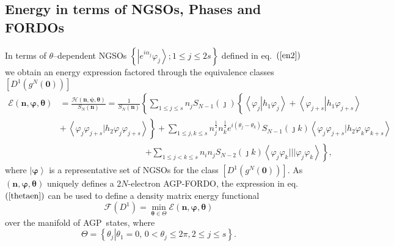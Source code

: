 \documentclass[aps,preprint]{revtex4}%
\begin{document}
\subsection{Energy in terms of NGSOs, Phases and FORDOs\label{EnON_NGSO}}

In terms of $\theta$--dependent NGSOs $\left\{  \left\vert e^{i\alpha_{j}%
}\varphi_{j}\right\rangle ;1\leq j\leq2s\right\}  $ defined in eq.\ $\left(
\ref{en2}\right)  $ we obtain an energy expression factored through the
equivalence classes $\left[  D^{1}\left(  g^{N}\left(  \boldsymbol{0}\right)
\right)  \right]  $
\begin{align}
\mathcal{E}\left(  \boldsymbol{n},\boldsymbol{\varphi},\boldsymbol{\theta
}\right)   &  =\frac{\mathcal{H}\left(  \boldsymbol{n},\boldsymbol{\psi
},\boldsymbol{\theta}\right)  }{S_{N}\left(  \boldsymbol{n}\right)  }=\frac
{1}{S_{N}\left(  \boldsymbol{n}\right)  }\left\{  \sum_{1\leq j\leq s}%
n_{j}S_{N-1}\left(  \jmath\right)  \left\{  \overset{}{\left\langle
\varphi_{j}\left\vert h_{1}\varphi_{j}\right.  \right\rangle +\left\langle
\varphi_{j+s}\left\vert h_{1}\varphi_{j+s}\right.  \right\rangle }\right.
\right. \nonumber\\
&  \left.  +\overset{}{\,\left\langle \varphi_{j}\varphi_{j+s}|h_{2}%
\varphi_{j}\varphi_{j+s}\right\rangle }\right\}  +\sum_{1\leq j,k\leq s}%
n_{j}^{\frac{1}{2}}n_{k}^{\frac{1}{2}}e^{i\left(  \theta_{j}-\theta
_{k}\right)  }S_{N-1}\left(  \jmath k\right)  \left\langle \varphi_{j}%
\varphi_{j+s}|h_{2}\varphi_{k}\varphi_{k+s}\right\rangle \nonumber\\
&  \qquad\qquad\qquad\qquad\qquad\left.  +\sum_{1\leq j<k\leq s}n_{i}%
n_{j}S_{N-2}\left(  \jmath k\right)  \left\langle \varphi_{j}\varphi
_{k}|||\varphi_{j}\varphi_{k}\right\rangle \right\}  , \label{thetaen}%
\end{align}
where $\left\vert \boldsymbol{\varphi}\right\rangle $ is a representative set
of NGSOs for the class $\left[  D^{1}\left(  g^{N}\left(  \boldsymbol{0}%
\right)  \right)  \right]  $. As $\left(  \boldsymbol{n},\boldsymbol{\varphi
,\theta}\right)  $ uniquely defines a $2N$-electron AGP-FORDO, the expression
in eq.\ $\left(  \ref{thetaen}\right)  $ can be used to define a density
matrix energy functional
\begin{equation}
\mathcal{F}\left(  D^{1}\right)  =\min_{\boldsymbol{\theta\in}\Theta
}\mathcal{E}\left(  \boldsymbol{n},\boldsymbol{\varphi},\boldsymbol{\theta
}\right)
\end{equation}
over the manifold of AGP\ states, where
\begin{equation}
\Theta=\left\{  \left.  \theta_{j}\right\vert \theta_{1}=0,\,0<\theta_{j}%
\leq2\pi,2\leq j\leq s\right\}  .
\end{equation}
\end{document}
